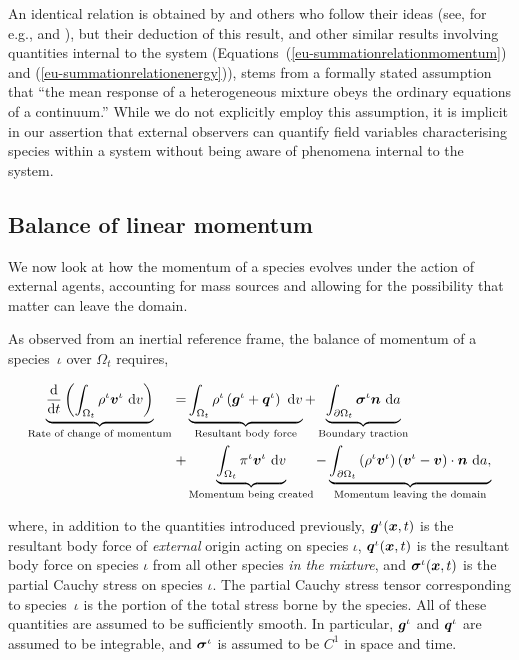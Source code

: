 An identical relation is obtained by \citet{TruesdellToupin:60} and
others who follow their ideas (see, for e.g., \citet{bowen76} and
\citet{passmanetal}), but their deduction of
this result, and other similar results involving quantities internal
to the system (Equations~(\ref{eu-summationrelationmomentum}) and
(\ref{eu-summationrelationenergy})), stems from a formally stated
assumption that ``the mean response of a heterogeneous mixture obeys
the ordinary equations of a continuum.'' While we do not explicitly
employ this assumption, it is implicit in our assertion that external
observers can quantify field variables characterising species within a
system without being aware of phenomena internal to the system.

\subsection{Balance of linear momentum}
\label{eu-balance-of-linear-momentum}

We now look at how the momentum of a species evolves under the action
of external agents, accounting for mass sources and allowing for the
possibility that matter can leave the domain.

As observed from an inertial reference frame, the balance of momentum
of a species~$\iota$ over $\Omega_{t}$ requires,

\begin{equation}
\begin{split}
\underbrace{\frac{\mathrm{d}}{\mathrm{d}t}\left(\int_{\Omega_{t}}
  \rho^{\iota} \mbox{\boldmath$ v$}^{\iota}\ \mathrm{d}v \right)}_{\text{Rate of change
    of momentum}} = & \underbrace{\int_{\Omega_{t}} \rho^{\iota}
  \left(\mbox{\boldmath$ g$}^{\iota} +
  \mbox{\boldmath$ q$}^{\iota}\right)\ \mathrm{d}v}_{\text{Resultant body force}} +
\underbrace{\int_{\partial \Omega_{t}}
  \mbox{\boldmath$\sigma$}^{\iota}\mbox{\boldmath$ n$}\ \mathrm{d}a}_{\text{Boundary traction}}\\ + &
\underbrace{\int_{\Omega_{t}}
  \pi^{\iota}\mbox{\boldmath$ v$}^{\iota}\ \mathrm{d}v}_{\text{Momentum being created}}
- \underbrace{\int_{\partial \Omega_{t}} \left(\rho^{\iota}
  \mbox{\boldmath$ v$}^{\iota} \right) \left(\mbox{\boldmath$ v$}^{\iota} - \mbox{\boldmath$ v$}\right) \cdot
  \mbox{\boldmath$ n$}\ \mathrm{d}a,}_{\text{Momentum leaving the domain}}
\end{split}
\label{eu-globalbalanceofmomentum}
\end{equation}

\noindent where, in addition to the quantities introduced previously,
$\mbox{\boldmath$ g$}^{\iota}(\mbox{\boldmath$ x$},t)$ is the resultant body force of {\em external}
origin acting on species $\iota$, $\mbox{\boldmath$ q$}^{\iota}(\mbox{\boldmath$ x$},t)$ is the
resultant body force on species $\iota$ from all other species {\em in
  the mixture}, and $\mbox{\boldmath$\sigma$}^{\iota}(\mbox{\boldmath$ x$},t)$ is the partial Cauchy
stress on species $\iota$. The partial Cauchy stress tensor
corresponding to species~$\iota$ is the portion of the total stress
borne by the species. All of these quantities are assumed to be
sufficiently smooth. In particular, $\mbox{\boldmath$ g$}^{\iota}$ and $\mbox{\boldmath$ q$}^{\iota}$
are assumed to be integrable, and $\mbox{\boldmath$\sigma$}^{\iota}$ is assumed to be
$\mathit{C}^{1}$ in space and time.

